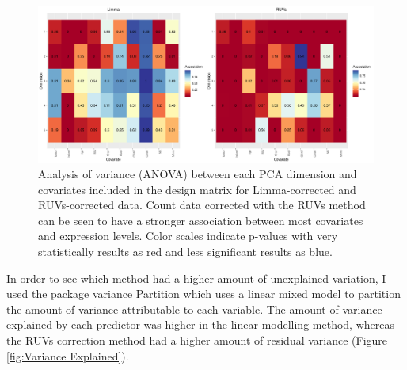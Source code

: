 \documentclass[12pt,a4paper,titlepage,twoside,openright]{book}
\begin{document}
\begin{mainmatter}
{{\begin{figure}[htb!]
\centering
\includegraphics[width=\textwidth,height=\textheight,keepaspectratio]{Figures/Heatmap_SigCovar_RUVvsLM_OnlyCovarInLM.pdf}
\caption{Analysis of variance (ANOVA) between each PCA dimension and covariates included in the design matrix for Limma-corrected and RUVs-corrected data. Count data corrected with the RUVs method can be seen to have a stronger association between most covariates and expression levels. Color scales indicate p-values with very statistically results as red and less significant results as blue.}
\label{fig:RUV vs Limma: Heatmap of Covariates}
\end{figure}

In order to see which method had a higher amount of unexplained variation, I used the package variance Partition \cite{hoffman2016variancepartition} which uses a linear mixed model to partition the amount of variance attributable to each variable. The amount of variance explained by each predictor was higher in the linear modelling method, whereas the RUVs correction method had a higher amount of residual variance (﻿Figure \ref{fig:Variance Explained}).

}}
\end{mainmatter}
\end{document}
